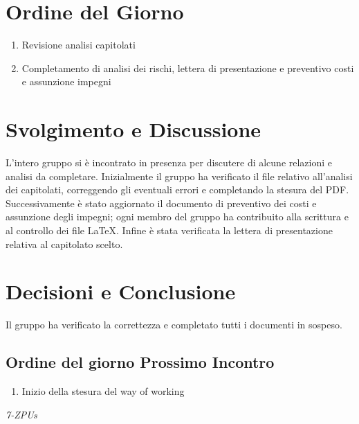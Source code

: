\documentclass[a4paper,12pt]{article}
\begin{document}
\section{Ordine del Giorno}
\begin{enumerate}
    \item Revisione analisi capitolati
    \item Completamento di analisi dei rischi, lettera di presentazione e preventivo costi e assunzione impegni
\end{enumerate}

\section{Svolgimento e Discussione}
L'intero gruppo si è incontrato in presenza per discutere di alcune relazioni e analisi da completare.
Inizialmente il gruppo ha verificato il file relativo all'analisi dei capitolati, correggendo gli eventuali errori e completando la stesura del PDF.
Successivamente è stato aggiornato il documento di preventivo dei costi e assunzione degli impegni; ogni membro del gruppo ha contribuito alla scrittura e al controllo dei file LaTeX.
Infine è stata verificata la lettera di presentazione relativa al capitolato scelto.
\vspace{0.5cm}
\section{Decisioni e Conclusione}
\noindent Il gruppo ha verificato la correttezza e completato tutti i documenti in sospeso.


\subsection{Ordine del giorno Prossimo Incontro}
\begin{enumerate}
    \item Inizio della stesura del way of working
\end{enumerate}

\vfill
\begin{flushright}
    \textit{7-ZPUs}
\end{flushright}
\end{document}
